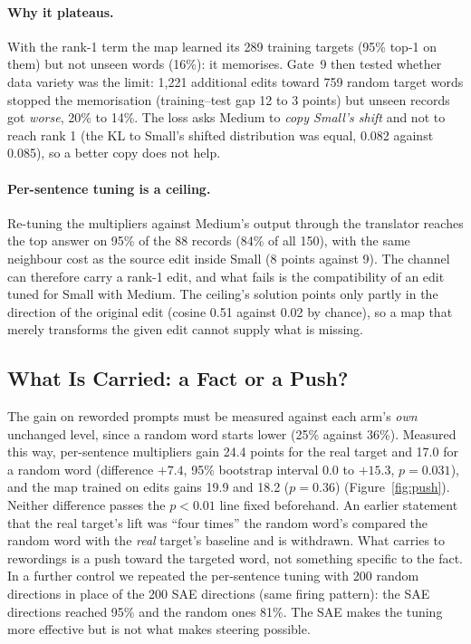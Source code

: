 \documentclass[11pt,twocolumn]{article}
\begin{document}
\paragraph{Why it plateaus.} With the rank-1 term the map learned its 289 training targets (95\% top-1 on them) but not unseen words (16\%): it memorises. Gate~9 then tested whether data variety was the limit: 1,221 additional edits toward 759 random target words stopped the memorisation (training--test gap 12 to 3 points) but unseen records got \emph{worse}, 20\% to 14\%. The loss asks Medium to \emph{copy Small's shift} and not to reach rank 1 (the KL to Small's shifted distribution was equal, 0.082 against 0.085), so a better copy does not help.

\paragraph{Per-sentence tuning is a ceiling.} Re-tuning the multipliers against Medium's output through the translator reaches the top answer on 95\% of the 88 records (84\% of all 150), with the same neighbour cost as the source edit inside Small (8 points against 9). The channel can therefore carry a rank-1 edit, and what fails is the compatibility of an edit tuned for Small with Medium. The ceiling's solution points only partly in the direction of the original edit (cosine 0.51 against 0.02 by chance), so a map that merely transforms the given edit cannot supply what is missing.

\subsection{What Is Carried: a Fact or a Push?}

The gain on reworded prompts must be measured against each arm's \emph{own} unchanged level, since a random word starts lower (25\% against 36\%). Measured this way, per-sentence multipliers gain 24.4 points for the real target and 17.0 for a random word (difference $+7.4$, 95\% bootstrap interval 0.0 to $+15.3$, $p=0.031$), and the map trained on edits gains 19.9 and 18.2 ($p=0.36$) (Figure~\ref{fig:push}). Neither difference passes the $p<0.01$ line fixed beforehand. An earlier statement that the real target's lift was ``four times'' the random word's compared the random word with the \emph{real} target's baseline and is withdrawn. What carries to rewordings is a push toward the targeted word, not something specific to the fact. In a further control we repeated the per-sentence tuning with 200 random directions in place of the 200 SAE directions (same firing pattern): the SAE directions reached 95\% and the random ones 81\%. The SAE makes the tuning more effective but is not what makes steering possible.
\end{document}

